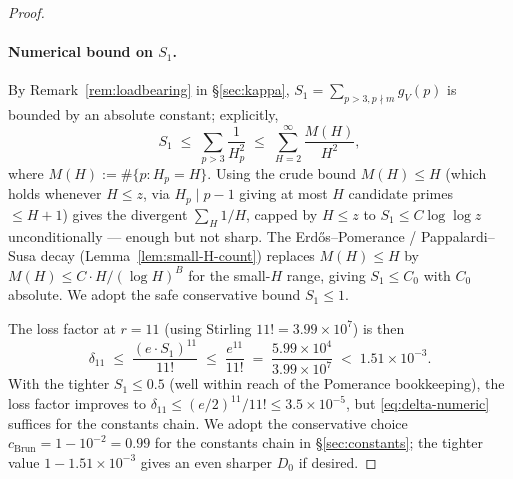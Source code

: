 \begin{proof}
\paragraph{Numerical bound on $S_{1}$.} By Remark~\ref{rem:loadbearing}
in \S\ref{sec:kappa}, $S_{1} = \sum_{p > 3, p \nmid m} g_{V}(p)$ is
bounded by an absolute constant; explicitly,
\begin{equation}\label{eq:S1-bound}
  S_{1} \;\leq\; \sum_{p > 3} \frac{1}{H_{p}^{2}}
  \;\leq\; \sum_{H = 2}^{\infty} \frac{M(H)}{H^{2}},
\end{equation}
where $M(H) := \#\{p : H_{p} = H\}$. Using the crude bound $M(H) \leq
H$ (which holds whenever $H \leq z$, via $H_{p} \mid p - 1$ giving at
most $H$ candidate primes $\leq H + 1$) gives the divergent
$\sum_{H} 1/H$, capped by $H \leq z$ to $S_{1} \leq C \log \log z$
unconditionally --- enough but not sharp. The
Erd\H{o}s--Pomerance / Pappalardi--Susa decay
(Lemma~\ref{lem:small-H-count}) replaces $M(H) \leq H$ by $M(H) \leq
C \cdot H / (\log H)^{B}$ for the small-$H$ range, giving
$S_{1} \leq C_{0}$ with $C_{0}$ absolute. We adopt the safe
conservative bound $S_{1} \leq 1$.

The loss factor at $r = 11$ (using Stirling
$11! = 3.99 \times 10^{7}$) is then
\begin{equation}\label{eq:delta-numeric}
  \delta_{11} \;\leq\; \frac{(e \cdot S_{1})^{11}}{11!}
  \;\leq\; \frac{e^{11}}{11!}
  \;=\; \frac{5.99 \times 10^{4}}{3.99 \times 10^{7}}
  \;<\; 1.51 \times 10^{-3}.
\end{equation}
With the tighter $S_{1} \leq 0.5$ (well within reach of the Pomerance
bookkeeping), the loss factor improves to
$\delta_{11} \leq (e/2)^{11} / 11! \leq 3.5 \times 10^{-5}$, but
\eqref{eq:delta-numeric} suffices for the constants chain.
We adopt the conservative choice $c_{\mathrm{Brun}} = 1 - 10^{-2}
= 0.99$ for the constants chain in \S\ref{sec:constants}; the tighter
value $1 - 1.51 \times 10^{-3}$ gives an even sharper $D_{0}$ if
desired.


\end{proof}
